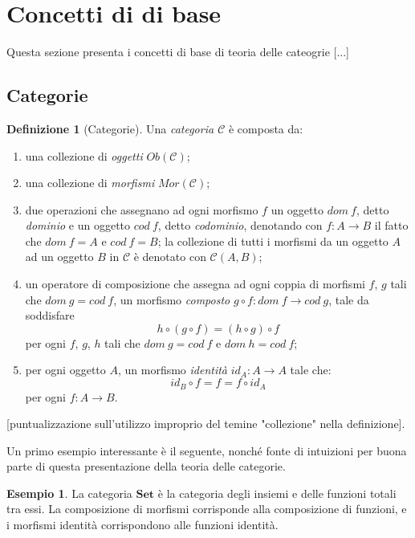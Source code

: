 \documentclass{article}
\theoremstyle{definition}
\newtheorem{definition}{Definizione}
\theoremstyle{definition}
\newtheorem{example}{Esempio}
\newcommand{\id}[1]{id_{#1}}
\begin{document}
\section{Concetti di di base}

Questa sezione presenta i concetti di base di teoria delle cateogrie [...] 

\subsection{Categorie}

	\begin{definition}[Categorie]
		Una \emph{categoria $\mathcal{C}$} è composta da:
		\begin{enumerate}
			\item una collezione di \emph{oggetti} $Ob(\mathcal{C})$;
			\item una collezione di \emph{morfismi} $Mor(\mathcal{C})$;
			\item due operazioni che assegnano ad ogni morfismo $f$ un oggetto $dom\ f$, detto \emph{dominio} e un oggetto $cod\ f$, detto \emph{codominio}, denotando con $f: A \rightarrow B$ il fatto che $dom\ f = A \text{ e } cod\ f = B$; la collezione di tutti i morfismi da un oggetto $A$ ad un oggetto $B$ in $\mathcal{C}$ è denotato con $\mathcal{C}(A, B)$;
			\item un operatore di composizione che assegna ad ogni coppia di morfismi $f$, $g$ tali che $dom\ g = cod\ f$, un morfismo \emph{composto} $g \circ f: dom\ f \rightarrow cod\ g$, tale da soddisfare
				\[
					h \circ (g \circ f) = (h \circ g) \circ f
				\]
				per ogni $f$, $g$, $h$ tali che $dom\ g = cod\ f \text{ e } dom\ h = cod\ f$;
			\item per ogni oggetto $A$, un morfismo \emph{identità} $\id{A}: A \rightarrow A$ tale che:
				\[
					\id{B} \circ f = f = f \circ \id{A}
				\]
				per ogni $f: A \rightarrow B$.
		\end{enumerate}
	\end{definition}

	[puntualizzazione sull'utilizzo improprio del temine "collezione" nella definizione].
	
	Un primo esempio interessante è il seguente, nonché fonte di intuizioni per buona parte di questa presentazione della teoria delle categorie.

	\begin{example}
		La categoria $\textbf{Set}$ è la categoria degli insiemi e delle funzioni totali tra essi. La composizione di morfismi corrisponde alla composizione di funzioni, e i morfismi identità corrispondono alle funzioni identità.
	\end{example}
\end{document}
